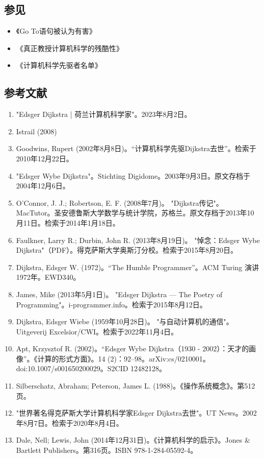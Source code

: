 \subsection{参见}
\begin{itemize}
\item 《Go To语句被认为有害》
\item 《真正教授计算机科学的残酷性》
\item 《计算机科学先驱者名单》
\end{itemize}
\subsection{参考文献}
\begin{enumerate}
\item "Edsger Dijkstra | 荷兰计算机科学家"。2023年8月2日。
\item Istrail (2008)
\item Goodwins, Rupert (2002年8月8日)。“计算机科学先驱Dijkstra去世”。检索于2010年12月22日。
\item "Edsger Wybe Dijkstra"。Stichting Digidome。2003年9月3日。原文存档于2004年12月6日。
\item O'Connor, J. J.; Robertson, E. F. (2008年7月)。 "Dijkstra传记"。MacTutor。圣安德鲁斯大学数学与统计学院，苏格兰。原文存档于2013年10月11日。检索于2014年1月18日。
\item Faulkner, Larry R.; Durbin, John R. (2013年8月19日)。 "悼念：Edsger Wybe Dijkstra"（PDF）。得克萨斯大学奥斯汀分校。检索于2015年8月20日。
\item Dijkstra, Edsger W. (1972)。“The Humble Programmer”。ACM Turing 演讲 1972年。EWD340。
\item James, Mike (2013年5月1日)。 "Edsger Dijkstra — The Poetry of Programming"。i-programmer.info。检索于2015年8月12日。
\item Dijkstra, Edsger Wiebe (1959年10月28日)。 "与自动计算机的通信"。Uitgeverij Excelsior/CWI。检索于2022年11月4日。
\item Apt, Krzysztof R. (2002)。“Edsger Wybe Dijkstra（1930 - 2002）：天才的画像”。《计算的形式方面》。14 (2)：92–98。arXiv:cs/0210001。doi:10.1007/s001650200029。S2CID 12482128。
\item Silberschatz, Abraham; Peterson, James L. (1988)。《操作系统概念》。第512页。
\item "世界著名得克萨斯大学计算机科学家Edsger Dijkstra去世"。UT News。2002年8月7日。检索于2020年8月4日。
\item Dale, Nell; Lewis, John (2014年12月31日)。《计算机科学的启示》。Jones & Bartlett Publishers。第316页。ISBN 978-1-284-05592-4。

\end{enumerate}
